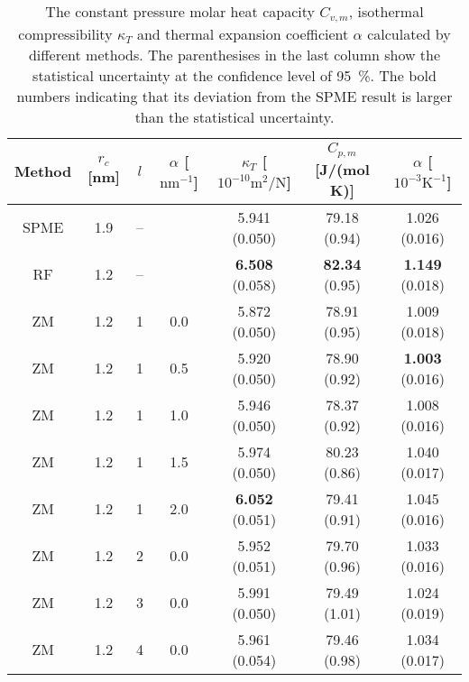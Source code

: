 \documentclass[aip,jcp,a4paper,preprint,unsortedaddress,onecolumn,fleqn]{revtex4-1}
\begin{document}
\begin{table}
  \centering
  \caption{The constant pressure molar heat capacity $C_{v,m}$, isothermal compressibility $\kappa_T$ and
    thermal expansion coefficient $\alpha$
    calculated by different methods.    
    The parenthesises in the last column show the statistical uncertainty
    at the confidence level of 95~\%.
    The bold numbers indicating that its deviation from the SPME result is larger than the statistical uncertainty.
  }
  \begin{tabular*}{0.9\textwidth}{@{\extracolsep{\fill}}cccc ccc}\hline\hline
    Method      &   $r_c$ [nm] &    $l$ & $\alpha$ [$\textrm{nm}^{-1}$]     & $\kappa_T$ [$10^{-10}\textrm{m}^2/\textrm{N}$] & $C_{p,m}$ [J/(mol K)] & $\alpha$ [$10^{-3}\textrm{K}^{-1}$]\\\hline
    SPME        &  1.9     &       -- &    & 5.941 (0.050)               &79.18 (0.94)           &1.026 (0.016)          \\
    RF          &  1.2     & --       &    & \textbf{6.508} (0.058)      &\textbf{82.34} (0.95)  &\textbf{1.149} (0.018) \\\hline
    ZM          &  1.2     &       1  & 0.0& 5.872 (0.050)               &78.91 (0.95)           &1.009 (0.018)          \\
    ZM          &  1.2     &       1  & 0.5& 5.920 (0.050)               &78.90 (0.92)           &\textbf{1.003} (0.016) \\
    ZM          &  1.2     &       1  & 1.0& 5.946 (0.050)               &78.37 (0.92)           &1.008 (0.016)          \\
    ZM          &  1.2     &       1  & 1.5& 5.974 (0.050)               &80.23 (0.86)           &1.040 (0.017)          \\
    ZM          &  1.2     &       1  & 2.0& \textbf{6.052} (0.051)      &79.41 (0.91)           &1.045 (0.016)          \\\hline
    ZM          &  1.2     &       2  & 0.0& 5.952 (0.051)               &79.70 (0.96)           &1.033 (0.016)          \\
    ZM          &  1.2     &       3  & 0.0& 5.991 (0.050)               &79.49 (1.01)           &1.024 (0.019)          \\
    ZM          &  1.2     &       4  & 0.0& 5.961 (0.054)               &79.46 (0.98)           &1.034 (0.017)          \\
    \hline\hline
  \end{tabular*}
  \label{tab:tmp3a}
\end{table}
\end{document}
